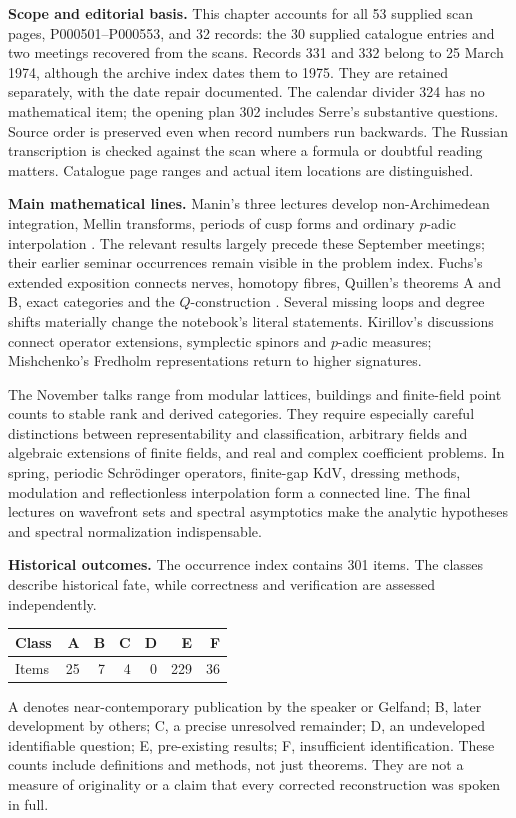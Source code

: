 \noindent\textbf{Scope and editorial basis.}
This chapter accounts for all 53 supplied scan pages, P000501--P000553, and
32 records: the 30 supplied catalogue entries and two meetings recovered
from the scans. Records 331 and 332 belong to 25 March 1974, although the
archive index dates them to 1975. They are retained separately, with the date
repair documented. The calendar divider 324 has no mathematical item; the
opening plan 302 includes Serre's substantive questions. Source order is
preserved even when record numbers run backwards. The Russian transcription
is checked against the scan where a formula or doubtful reading matters.
Catalogue page ranges and actual item locations are distinguished.

\medskip\noindent\textbf{Main mathematical lines.}
Manin's three lectures develop non-Archimedean integration, Mellin transforms,
periods of cusp forms and ordinary \(p\)-adic interpolation
\citep{manin1973periods}. The relevant
results largely precede these September meetings; their earlier seminar
occurrences remain visible in the problem index. Fuchs's extended exposition
connects nerves, homotopy fibres, Quillen's theorems A and B, exact categories
and the \(Q\)-construction \citep{quillen1973higher}. Several missing loops and degree shifts materially
change the notebook's literal statements. Kirillov's discussions connect
operator extensions, symplectic spinors and \(p\)-adic measures; Mishchenko's
Fredholm representations return to higher signatures.

The November talks range from modular lattices, buildings and finite-field
point counts to stable rank and derived categories. They require especially
careful distinctions between representability and classification, arbitrary
fields and algebraic extensions of finite fields, and real and complex
coefficient problems. In spring, periodic Schr\"odinger operators, finite-gap
KdV, dressing methods, modulation and reflectionless interpolation form a
connected line. The final lectures on wavefront sets and spectral asymptotics
make the analytic hypotheses and spectral normalization indispensable.

\medskip\noindent\textbf{Historical outcomes.}
The occurrence index contains 301 items. The classes describe historical
fate, while correctness and verification are assessed independently.
\begin{center}
\begin{tabular}{@{}lrrrrrr@{}}
\toprule
Class & A & B & C & D & E & F\\
\midrule
Items & 25 & 7 & 4 & 0 & 229 & 36\\
\bottomrule
\end{tabular}
\end{center}
\noindent
A denotes near-contemporary publication by the speaker or Gelfand; B, later
development by others; C, a precise unresolved remainder; D, an undeveloped
identifiable question; E, pre-existing results; F, insufficient identification.
These counts include definitions and methods, not just theorems. They are
not a measure of originality or a claim that every corrected reconstruction
was spoken in full.


